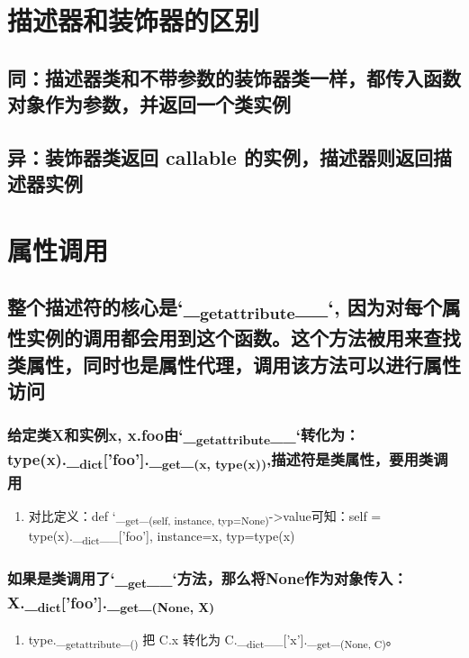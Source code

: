 \documentclass[11pt]{article}
\begin{document}
\section{描述器和装饰器的区别}
\label{sec:orge3a3574}
\subsection{同：描述器类和不带参数的装饰器类一样，都传入函数对象作为参数，并返回一个类实例}
\label{sec:org065fba2}
\subsection{异：装饰器类返回 callable 的实例，描述器则返回描述器实例}
\label{sec:org39ddf18}
\section{属性调用}
\label{sec:orgeb8bb72}
\subsection{整个描述符的核心是`\_\textsubscript{getattribute}\_\_`, 因为对每个属性实例的调用都会用到这个函数。这个方法被用来查找类属性，同时也是属性代理，调用该方法可以进行属性访问}
\label{sec:orgf283b64}
\subsubsection{给定类X和实例x, x.foo由`\_\textsubscript{getattribute}\_\_`转化为：type(x).\_\textsubscript{dict}['foo'].\_\textsubscript{get}\_\textsubscript{(x, type(x))},描述符是类属性，要用类调用}
\label{sec:orgb8336a9}
\begin{enumerate}
\item 对比定义：def `\_\textsubscript{get}\_\textsubscript{(self, instance, typ=None)}->value可知：self = type(x).\_\textsubscript{dict}\_\_['foo'], instance=x, typ=type(x)
\label{sec:org7316421}
\end{enumerate}
\subsubsection{如果是类调用了`\_\textsubscript{get}\_\_`方法，那么将None作为对象传入：X.\_\textsubscript{dict}['foo'].\_\textsubscript{get}\_\textsubscript{(None, X)}}
\label{sec:org2e0c771}
\begin{enumerate}
\item type.\_\textsubscript{getattribute}\_\textsubscript{()} 把 C.x 转化为 C.\_\textsubscript{dict}\_\_['x'].\_\textsubscript{get}\_\textsubscript{(None, C)}。
\label{sec:org5071c75}
\end{enumerate}
\end{document}
